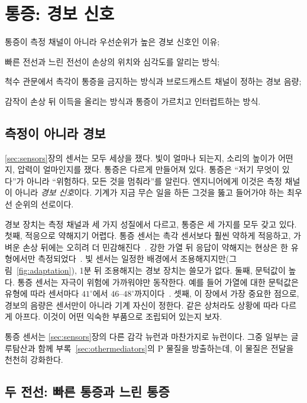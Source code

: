 \chapter{통증: 경보 신호}
\label{sec:pain}
\begin{chaptergoals}
\item 통증이 측정 채널이 아니라 우선순위가 높은 경보 신호인 이유;
\item 빠른 전선과 느린 전선이 손상의 위치와 심각도를 알리는 방식;
\item 척수 관문에서 촉각이 통증을 금지하는 방식과 브로드캐스트 채널이 정하는 경보 음량;
\item 감작이 손상 뒤 이득을 올리는 방식과 통증이 가르치고 인터럽트하는 방식.
\end{chaptergoals}

\section{측정이 아니라 경보}

\ref{sec:sensors}장의 센서는 모두 세상을 쟀다. 빛이 얼마나 되는지, 소리의 높이가 어떤지, 압력이 얼마인지를 쟀다. 통증은 다르게 만들어져 있다. 통증은 “저기 무엇이 있다”가 아니라 “위험하다, 모든 것을 멈춰라”를 알린다. 엔지니어에게 이것은 측정 채널이 아니라 \emph{경보 신호}이다. 기계가 지금 무슨 일을 하든 그것을 뚫고 들어가야 하는 최우선 순위의 선로이다.

경보 장치는 측정 채널과 세 가지 성질에서 다르고, 통증은 세 가지를 모두 갖고 있다. 첫째, 적응으로 약해지기 어렵다. 통증 센서는 촉각 센서보다 훨씬 약하게 적응하고, 가벼운 손상 뒤에는 오히려 더 민감해진다~\cite{LaMotte1982hyper}. 강한 가열 뒤 응답이 약해지는 현상은 한 유형에서만 측정되었다~\cite{Treede1995heat}. 빛 센서는 일정한 배경에서 조용해지지만(그림~\ref{fig:adaptation}), 1분 뒤 조용해지는 경보 장치는 쓸모가 없다. 둘째, 문턱값이 높다. 통증 센서는 자극이 위험에 가까워야만 동작한다. 예를 들어 가열에 대한 문턱값은 유형에 따라 센서마다 $41^\circ$에서 $46$--$48^\circ$까지이다~\cite{Treede1995heat, Weidner1999cfib}. 셋째, 이 장에서 가장 중요한 점으로, 경보의 음량은 센서만이 아니라 기계 자신이 정한다. 같은 상처라도 상황에 따라 다르게 아프다. 이것이 어떤 익숙한 부품으로 조립되어 있는지 보자.

통증 센서는 \ref{sec:sensors}장의 다른 감각 뉴런과 마찬가지로  뉴런이다. 그중 일부는 글루탐산과 함께 부록~\ref{sec:othermediators}의 P 물질을 방출하는데, 이 물질은 전달을 천천히 강화한다.

\section{두 전선: 빠른 통증과 느린 통증}

